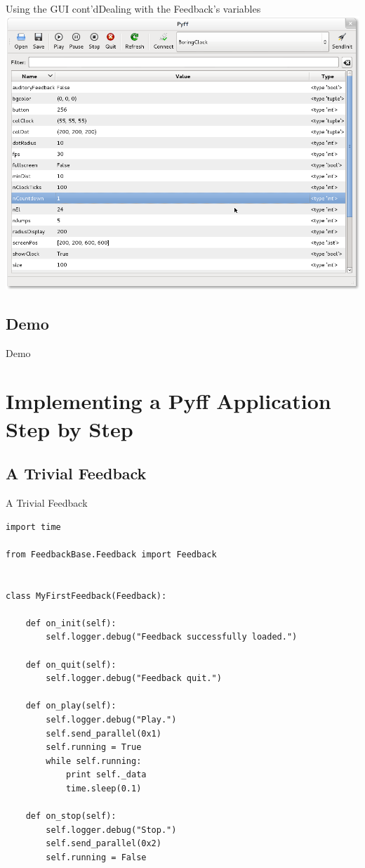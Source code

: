\documentclass{beamer}
\begin{document}
\begin{frame}{Using the GUI cont'd}{Dealing with the Feedback's variables}
    \includegraphics[width=.9\linewidth]{gui}
\end{frame}

\subsection{Demo}
\begin{frame}[plain]
    \begin{center}
        \huge{Demo}
    \end{center}
\end{frame}


\section{Implementing a Pyff Application Step by Step}

\subsection{A Trivial Feedback}
\begin{frame}[fragile]{A Trivial Feedback}
    \begin{lstlisting}
import time

from FeedbackBase.Feedback import Feedback


class MyFirstFeedback(Feedback):

    def on_init(self):
        self.logger.debug("Feedback successfully loaded.")

    def on_quit(self):
        self.logger.debug("Feedback quit.")

    def on_play(self):
        self.logger.debug("Play.")
        self.send_parallel(0x1)
        self.running = True
        while self.running:
            print self._data
            time.sleep(0.1)

    def on_stop(self):
        self.logger.debug("Stop.")
        self.send_parallel(0x2)
        self.running = False

    \end{lstlisting}
\end{frame}
\end{document}
